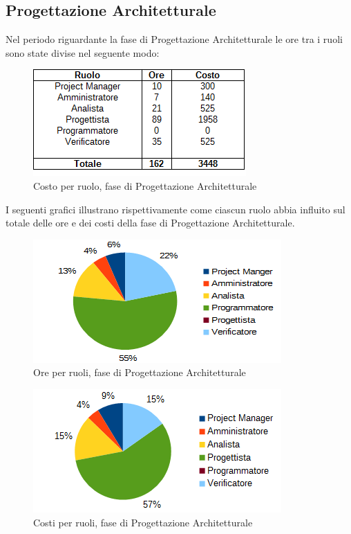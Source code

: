 	\subsection{Progettazione Architetturale}
	Nel periodo riguardante la fase di Progettazione Architetturale le ore tra i ruoli sono state divise nel seguente modo: \\
	\begin{figure}[H]
		\centering
		\includegraphics[scale=0.75]{immagini/tabelle/progettazione_architetturale-costo.png}
		\caption{Costo per ruolo, fase di Progettazione Architetturale}
	\end{figure}
	I seguenti grafici illustrano rispettivamente come ciascun ruolo abbia influito sul totale
delle ore e dei costi della fase di Progettazione Architetturale. \\
	\begin{figure}[H]
		\centering
		\includegraphics[scale=1]{immagini/grafici/progettazione_architetturale-torta.png}
		\caption{Ore per ruoli, fase di Progettazione Architetturale}
	\end{figure}
	\begin{figure}[H]
		\centering
		\includegraphics[scale=1]{immagini/grafici/progettazione_architetturale-torta-costo.png}
		\caption{Costi per ruoli, fase di Progettazione Architetturale}
	\end{figure}
